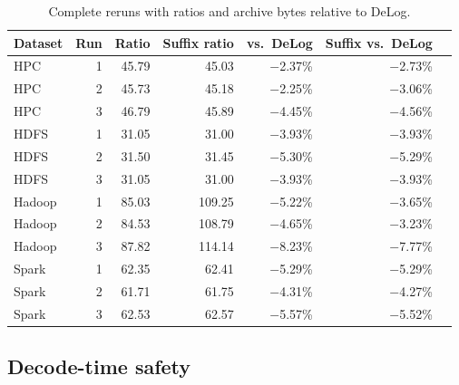 \begin{longtable}{lrrrrrr}\caption{Complete reruns with ratios and archive bytes relative to DeLog.}\label{tab:reruns}\\\toprule

Dataset & Run & Ratio & Suffix ratio & vs.\ DeLog & Suffix vs.\ DeLog & \\\midrule

HPC & 1 & 45.79 & 45.03 & $-$2.37\% & $-$2.73\% & \\

HPC & 2 & 45.73 & 45.18 & $-$2.25\% & $-$3.06\% & \\

HPC & 3 & 46.79 & 45.89 & $-$4.45\% & $-$4.56\% & \\

HDFS & 1 & 31.05 & 31.00 & $-$3.93\% & $-$3.93\% & \\

HDFS & 2 & 31.50 & 31.45 & $-$5.30\% & $-$5.29\% & \\

HDFS & 3 & 31.05 & 31.00 & $-$3.93\% & $-$3.93\% & \\

Hadoop & 1 & 85.03 & 109.25 & $-$5.22\% & $-$3.65\% & \\

Hadoop & 2 & 84.53 & 108.79 & $-$4.65\% & $-$3.23\% & \\

Hadoop & 3 & 87.82 & 114.14 & $-$8.23\% & $-$7.77\% & \\

Spark & 1 & 62.35 & 62.41 & $-$5.29\% & $-$5.29\% & \\

Spark & 2 & 61.71 & 61.75 & $-$4.31\% & $-$4.27\% & \\

Spark & 3 & 62.53 & 62.57 & $-$5.57\% & $-$5.52\% & \\

\bottomrule\end{longtable}

\subsection{Decode-time safety}

